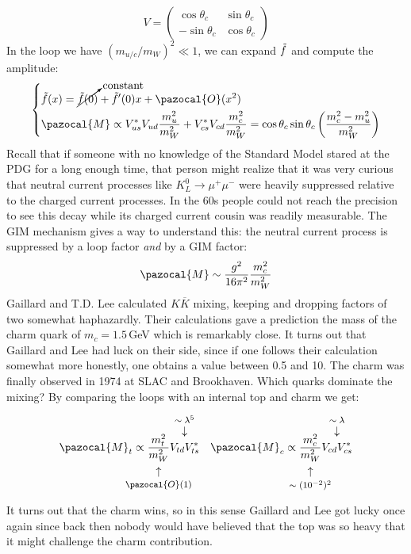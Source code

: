 \documentclass[../main.tex]{subfiles}
\begin{document}
\[
V=\left(\begin{array}{cc}
    \cos\theta_c & \sin\theta_c \\
    -\sin\theta_c & \cos\theta_c
\end{array}\right)
\]
In the loop we have $(m_{u/c}/m_W)^2\ll1$, we can expand $\Tilde{f}$ and compute the amplitude:
\[
\left\{
\begin{aligned}
&\Tilde{f}(x)=\cancelto{\text{constant}}{\Tilde{f}(0)}+\Tilde{f}'(0)x+\pazocal{O}(x^2)\\
&\pazocal{M}\propto V_{us}^*V_{ud}\frac{m_u^2}{m_W^2}+V_{cs}^*V_{cd}\frac{m_c^2}{m_W^2}=\cos\theta_c\sin\theta_c\left(\frac{m_c^2-m_u^2}{m_W^2}\right)
\end{aligned}
\right.
\]
Recall that if someone with no knowledge of the Standard Model
stared at the PDG for a long enough time, that person might realize that it was very curious that
neutral current processes like $K_L^0\to\mu^+\mu^-$ were heavily suppressed relative to the charged current
processes. In the 60s people could not reach the precision to see this decay while its charged current
cousin was readily measurable. The GIM mechanism gives a way to understand this: the neutral current process is
suppressed by a loop factor \textit{and} by a GIM factor:
\[
\pazocal{M}\sim\frac{g^2}{16\pi^2}\frac{m_c^2}{m_W^2}
\]
Gaillard and T.D. Lee calculated $K\overline{K}$ mixing, keeping and dropping factors of two somewhat
haphazardly. Their calculations gave a prediction the mass of the charm quark of $m_c=1.5$\,GeV which is remarkably close. It turns out that Gaillard and Lee
had luck on their side, since if one follows their calculation somewhat more honestly, one obtains a value between 0.5 and 10. The charm was finally observed in 1974 at SLAC and Brookhaven. Which quarks dominate the mixing? By comparing the loops with an internal top and charm we get:
\[
\pazocal{M}_t\propto\underset{\mathclap{\tikz \node {$\uparrow$} node [below=1ex] {\footnotesize  $\pazocal{O}(1)$};}}{\frac{m_t^2}{m_W^2}}\overset{\mathclap{\tikz \node {$\downarrow$} node [above=1ex] {\footnotesize $\sim\lambda^5$};}}{V_{td}V_{ts}^*} \quad \pazocal{M}_c\propto\underset{\mathclap{\tikz \node {$\uparrow$} node [below=1ex] {\footnotesize  $\sim(10^{-2})^2$};}}{\frac{m_c^2}{m_W^2}}\overset{\mathclap{\tikz \node {$\downarrow$} node [above=1ex] {\footnotesize $\sim\lambda$};}}{V_{cd}V_{cs}^*}
\]
It turns out that the charm wins, so in this sense Gaillard and Lee got lucky once again since back then nobody would have believed that the top was so heavy that it might challenge the charm contribution.
\end{document}
